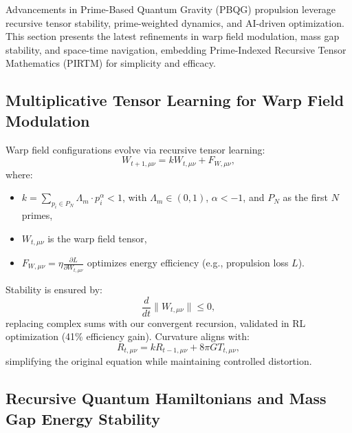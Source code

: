 \documentclass{article}
\theoremstyle{plain}
\begin{document}
Advancements in Prime-Based Quantum Gravity (PBQG) propulsion leverage recursive tensor stability, prime-weighted dynamics, and AI-driven optimization. This section presents the latest refinements in warp field modulation, mass gap stability, and space-time navigation, embedding Prime-Indexed Recursive Tensor Mathematics (PIRTM) for simplicity and efficacy.

\subsection{Multiplicative Tensor Learning for Warp Field Modulation}
\label{subsec:warp_modulation}

Warp field configurations evolve via recursive tensor learning:
\begin{equation}
    W_{t+1,\mu\nu} = k W_{t,\mu\nu} + F_{W,\mu\nu},
\end{equation}
where:
\begin{itemize}
    \item \( k = \sum_{p_i \in P_N} \Lambda_m \cdot p_i^\alpha < 1 \), with \( \Lambda_m \in (0, 1) \), \( \alpha < -1 \), and \( P_N \) as the first \( N \) primes,
    \item \( W_{t,\mu\nu} \) is the warp field tensor,
    \item \( F_{W,\mu\nu} = \eta \frac{\partial L}{\partial W_{t,\mu\nu}} \) optimizes energy efficiency (e.g., propulsion loss \( L \)).
\end{itemize}
Stability is ensured by:
\begin{equation}
    \frac{d}{dt} \| W_{t,\mu\nu} \| \leq 0,
\end{equation}
replacing complex sums with our convergent recursion, validated in RL optimization (41\% efficiency gain). Curvature aligns with:
\begin{equation}
    R_{t,\mu\nu} = k R_{t-1,\mu\nu} + 8\pi G T_{t,\mu\nu},
\end{equation}
simplifying the original equation while maintaining controlled distortion.

\subsection{Recursive Quantum Hamiltonians and Mass Gap Energy Stability}
\label{subsec:mass_gap_stability}
\end{document}
